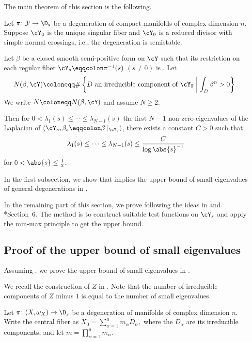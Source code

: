 \documentclass[12pt]{amsart}
\begin{document}
The main theorem of this section is the following.
\begin{theorem}
    \label{thm:stable-degeneration-upper-bound}
    Let $\pi \colon \mathcal{Y} \to \D_s$ be a degeneration 
    of compact \Kahler manifolds of complex dimension $n$. Suppose $\cY_0$ is the unique
    singular fiber and $\cY_0$ is a reduced divisor with
    simple normal crossings, i.e., the degeneration is 
    semistable. 

    Let $\beta$ be a closed smooth semi-positive
    form on $\cY$ such that its restriction on each regular 
    fiber $\cY_s\eqqcolon \pi^{-1}(s)$ $(s \neq 0)$ is \Kahler. Let 
    \[
    N(\beta, \cY) \coloneqq \# \left\{ D \text{ an irreducible component of } \cY_0 \;\middle|\; \int_D \beta^n > 0 \right\}.
    \]
    We write $N \coloneqq N(\beta, \cY)$ and 
    assume $N \geq 2$.

    Then for $0 < \lambda_1(s) \leq \cdots \leq \lambda_{N-1}(s)$
    the first $N - 1$ non-zero eigenvalues of the Laplacian of $(\cY_s, \beta_s\eqqcolon \beta\mid_{\cY_s})$, there
    exists a constant $C > 0$ such that 
    \[
    \lambda_1(s) \leq \cdots \leq \lambda_{N-1}(s) 
    \leq \frac{C}{\log\abs{s}^{-1}}
    \]
    for $0 < \abs{s} \leq \frac{1}{2}$.
\end{theorem}

In the first subsection, we show that  implies the upper bound 
of {small eigenvalues} of general degenerations in . 

In the remaining part of this section,
we prove  following
the ideas in \cite{Yoshikawa1997} and 
\cite{Dai-Yoshikawa2025}*{Section~6}. 
The method is to construct suitable test functions on $\cY_s$ and apply the min-max 
principle to get the upper bound.  

\subsection{Proof of the upper bound of {small eigenvalues}}
Assuming , we prove the upper 
bound of {small eigenvalues} in .

We recall the construction of $Z$ in . Note that the number of irreducible
components of $Z$ minus $1$ is equal to the number of small eigenvalues.

Let \(\pi\colon (X, \omega_X) \to \D_s\) be a degeneration of \Kahler
manifolds of complex dimension \(n\). Write the central fiber as
\(
X_0 = \sum_{\alpha=1}^a m_\alpha D_\alpha,
\)
where the \(D_\alpha\) are its irreducible components, and let
\(
m = \prod_{\alpha=1}^a m_\alpha.
\)
\end{document}
